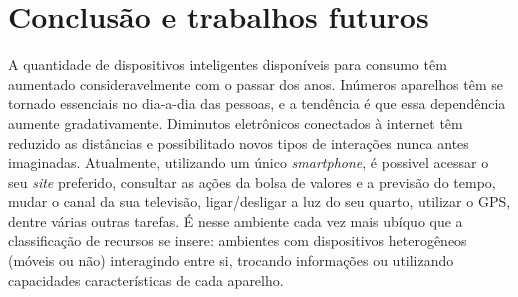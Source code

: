 \chapter{Conclusão e trabalhos futuros}

A quantidade de dispositivos inteligentes disponíveis para consumo têm aumentado consideravelmente com o passar dos anos. Inúmeros aparelhos têm se tornado essenciais no dia-a-dia das pessoas, e a tendência é que essa dependência aumente gradativamente. Diminutos eletrônicos conectados à internet têm reduzido as distâncias e possibilitado novos tipos de interações nunca antes imaginadas. Atualmente, utilizando um único \emph{smartphone}, é possivel acessar o seu \emph{site} preferido, consultar as ações da bolsa de valores e a previsão do tempo, mudar o canal da sua televisão, ligar/desligar a luz do seu quarto, utilizar o GPS, dentre várias outras tarefas.
É nesse ambiente cada vez mais ubíquo que a classificação de recursos se insere: ambientes com dispositivos heterogêneos (móveis ou não) interagindo entre si, trocando informações ou utilizando capacidades características de cada aparelho.


